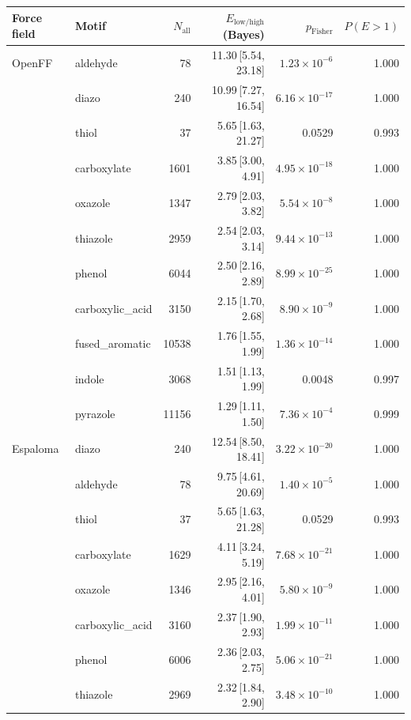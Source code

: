 \begin{table}[t]
  \centering
  \small
  \setlength{\tabcolsep}{6pt}
  \renewcommand{\arraystretch}{1.15}
  \begin{tabular}{llrrrr}
    \hline
    Force field & Motif & $N_\mathrm{all}$ & $E_{\mathrm{low/high}}$ (Bayes) & $p_\mathrm{Fisher}$ & $P(E>1)$ \\
    \hline
    OpenFF & aldehyde & 78 & 11.30\,[5.54, 23.18] & $1.23\times 10^{-6}$ & 1.000 \\
      & diazo & 240 & 10.99\,[7.27, 16.54] & $6.16\times 10^{-17}$ & 1.000 \\
      & thiol & 37 & 5.65\,[1.63, 21.27] & 0.0529 & 0.993 \\
      & carboxylate & 1601 & 3.85\,[3.00, 4.91] & $4.95\times 10^{-18}$ & 1.000 \\
      & oxazole & 1347 & 2.79\,[2.03, 3.82] & $5.54\times 10^{-8}$ & 1.000 \\
      & thiazole & 2959 & 2.54\,[2.03, 3.14] & $9.44\times 10^{-13}$ & 1.000 \\
      & phenol & 6044 & 2.50\,[2.16, 2.89] & $8.99\times 10^{-25}$ & 1.000 \\
      & carboxylic\_acid & 3150 & 2.15\,[1.70, 2.68] & $8.90\times 10^{-9}$ & 1.000 \\
      & fused\_aromatic & 10538 & 1.76\,[1.55, 1.99] & $1.36\times 10^{-14}$ & 1.000 \\
      & indole & 3068 & 1.51\,[1.13, 1.99] & 0.0048 & 0.997 \\
      & pyrazole & 11156 & 1.29\,[1.11, 1.50] & $7.36\times 10^{-4}$ & 0.999 \\
    \hline
    Espaloma & diazo & 240 & 12.54\,[8.50, 18.41] & $3.22\times 10^{-20}$ & 1.000 \\
      & aldehyde & 78 & 9.75\,[4.61, 20.69] & $1.40\times 10^{-5}$ & 1.000 \\
      & thiol & 37 & 5.65\,[1.63, 21.28] & 0.0529 & 0.993 \\
      & carboxylate & 1629 & 4.11\,[3.24, 5.19] & $7.68\times 10^{-21}$ & 1.000 \\
      & oxazole & 1346 & 2.95\,[2.16, 4.01] & $5.80\times 10^{-9}$ & 1.000 \\
      & carboxylic\_acid & 3160 & 2.37\,[1.90, 2.93] & $1.99\times 10^{-11}$ & 1.000 \\
      & phenol & 6006 & 2.36\,[2.03, 2.75] & $5.06\times 10^{-21}$ & 1.000 \\
      & thiazole & 2969 & 2.32\,[1.84, 2.90] & $3.48\times 10^{-10}$ & 1.000 \\

\end{tabular}
\end{table}
